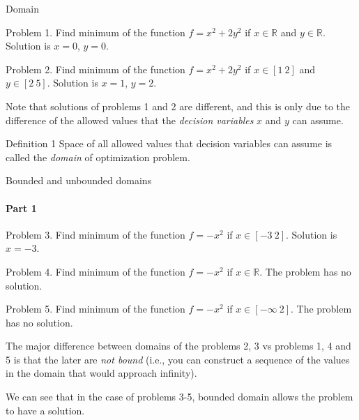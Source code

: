 \documentclass{beamer}
\begin{document}
\begin{frame}{Domain}
	\begin{flushleft}
		
		Problem 1. Find minimum of the function $f = x^2 + 2y^2$ if $x \in \mathbb{R}$ and $y \in \mathbb{R}$. Solution is $x = 0$, $y = 0$.
		
		\bigskip
		
		Problem 2. Find minimum of the function $f = x^2 + 2y^2$ if $x \in [1 \ 2]$ and $y \in [2 \ 5]$. Solution is $x = 1$, $y = 2$.
		
		\bigskip
		
		Note that solutions of problems 1 and 2 are different, and this is only due to the difference of the allowed values that the \emph{decision variables} $x$ and $y$ can assume.
		
		\begin{block}{Definition 1}
			Space of all allowed values that decision variables can assume is called the \emph{domain} of optimization problem.
		\end{block}
		
	\end{flushleft}
\end{frame}



\begin{frame}{Bounded and unbounded domains}
	\framesubtitle{Part 1}
	\begin{flushleft}
		
		Problem 3. Find minimum of the function $f = -x^2$ if $x \in [-3 \ 2]$. Solution is $x = -3$.
		
		\bigskip
		
		Problem 4. Find minimum of the function $f = -x^2$ if $x \in \mathbb{R}$. The problem has no solution.
		
		\bigskip
		
		Problem 5. Find minimum of the function $f = -x^2$ if $x \in  [-\infty \ 2]$. The problem has no solution.
		
		\bigskip
		
		The major difference between domains of the problems 2, 3 vs problems 1, 4 and 5 is that the later are \emph{not bound} (i.e., you can construct a sequence of the values in the domain that would approach infinity).
		
		\bigskip
		
		We can see that in the case of problems 3-5, bounded domain allows the problem to have a solution.
		
	\end{flushleft}
\end{frame}
\end{document}
